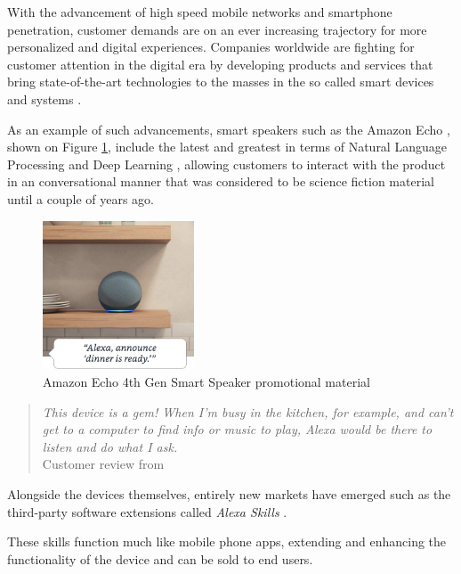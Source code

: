 \documentclass[openright]{normas-utf-tex} %
\begin{document}
With the advancement of high speed mobile networks and smartphone penetration,
customer demands are on an ever increasing trajectory for more personalized and
digital experiences. Companies worldwide are fighting for customer attention in 
the digital era by developing products and services that bring state-of-the-art 
technologies to the masses in the so called smart devices and systems \cite{Shafique2020}.

As an example of such advancements, smart speakers such as the Amazon Echo
\cite{GaoPanWangChen2018}, shown on Figure \ref{fig:echodot4}, include the latest and greatest in terms of Natural
Language Processing and Deep Learning \cite{Young2018}, allowing customers to
interact with the product in an conversational manner that was considered to be
science fiction material until a couple of years ago.

\begin{figure}[!htb]
	\centering
	\includegraphics[width=0.4\textwidth]{./images/echodot4.jpg} %
	\caption[Amazon Echo 4th Generation smart speaker promotional material]{Amazon Echo 4th Gen Smart Speaker promotional material}
	\label{fig:echodot4}
\end{figure}

\begin{quote}
    \textit{This device is a gem! When I’m busy in the kitchen, for example, and can’t get
    to a computer to find info or music to play, Alexa would be there to listen
    and do what I ask.} \\
    Customer review from \cite{GaoPanWangChen2018}
\end{quote}

Alongside the devices themselves, entirely new markets have emerged such as the
third-party software extensions called \textit{Alexa Skills} \cite{Alexa2022}.

These skills function much like mobile phone apps, extending and enhancing the
functionality of the device and can be sold to end users.
\end{document}
